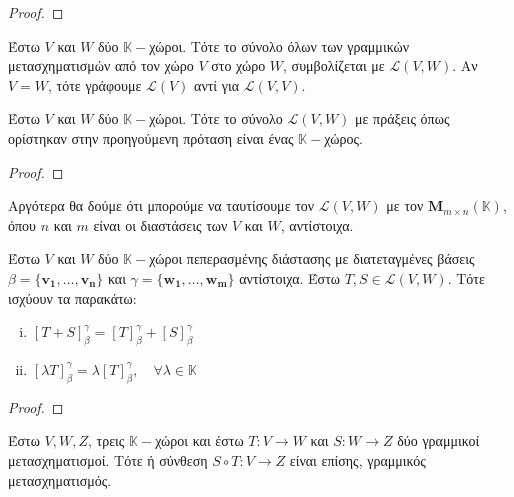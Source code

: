 \begin{proof}
\end{proof}

\begin{dfn}
  Έστω $V$ και $W$ δύο $ \mathbb{K}- $χώροι. Τότε το σύνολο όλων των γραμμικών
  μετασχηματισμών από τον χώρο $V$ στο χώρο $W$, συμβολίζεται με $ \mathcal{L}(V,W) $. 
  Αν $ V=W $, τότε γράφουμε $ \mathcal{L}(V) $ αντί για $ \mathcal{L}(V,V) $.
\end{dfn}

\begin{thm}
  Έστω $V$ και $W$ δύο $ \mathbb{K}- $χώροι. Τότε το σύνολο $ \mathcal{L}(V,W) $ 
  με πράξεις όπως ορίστηκαν στην προηγούμενη πρόταση είναι ένας $ \mathbb{K}- $χώρος.
\end{thm}

\begin{proof}
\end{proof}

Αργότερα θα δούμε ότι μπορούμε να ταυτίσουμε τον $ \mathcal{L}(V,W) $ με τον $
\textbf{M}_{m \times n}(\mathbb{K}) $, όπου $n$ και $m$ είναι οι διαστάσεις των 
$V$ και $W$, αντίστοιχα. 

\begin{thm}
  Έστω $V$ και $W$ δύο $ \mathbb{K}- $χώροι πεπερασμένης διάστασης με διατεταγμένες 
  βάσεις $ \beta = \{ \mathbf{v_{1}}, \ldots, \mathbf{v_{n}} \} $ και $ \gamma = 
  \{ \mathbf{w_{1}}, \ldots, \mathbf{w_{m}} \} $ αντίστοιχα. Έστω $ T,S \in
  \mathcal{L}(V,W) $. Τότε ισχύουν τα παρακάτω:
  \begin{enumerate}[i)]
    \item $ [T+S]_{\beta}^{\gamma} = [T]_{\beta}^{\gamma} + [S]_{\beta}^{\gamma}$
    \item $ [\lambda T]_{\beta}^{\gamma} = \lambda [T]_{\beta}^{\gamma}, \quad \forall
      \lambda \in \mathbb{K} $
  \end{enumerate}
\end{thm}

\begin{proof}
\end{proof}


\begin{thm}
  Έστω $ V,W,Z $, τρεις $ \mathbb{K}- $χώροι και έστω $ T \colon V \to W $ και $ S
  \colon W \to Z $ δύο γραμμικοί μετασχηματισμοί. Τότε ή σύνθεση 
  $ S \circ T \colon V \to Z $ είναι επίσης, γραμμικός μετασχηματισμός.
\end{thm}

